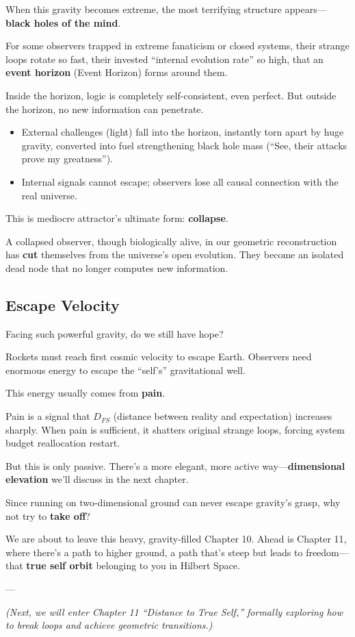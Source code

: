 When this gravity becomes extreme, the most terrifying structure appears---\textbf{black holes of the mind}.

For some observers trapped in extreme fanaticism or closed systems, their strange loops rotate so fast, their invested ``internal evolution rate'' so high, that an \textbf{event horizon} (Event Horizon) forms around them.

Inside the horizon, logic is completely self-consistent, even perfect. But outside the horizon, no new information can penetrate.

\begin{itemize}
\item External challenges (light) fall into the horizon, instantly torn apart by huge gravity, converted into fuel strengthening black hole mass (``See, their attacks prove my greatness'').

\item Internal signals cannot escape; observers lose all causal connection with the real universe.
\end{itemize}

This is mediocre attractor's ultimate form: \textbf{collapse}.

A collapsed observer, though biologically alive, in our geometric reconstruction has \textbf{cut} themselves from the universe's open evolution. They become an isolated dead node that no longer computes new information.

\subsection{Escape Velocity}

Facing such powerful gravity, do we still have hope?

Rockets must reach first cosmic velocity to escape Earth. Observers need enormous energy to escape the ``self's'' gravitational well.

This energy usually comes from \textbf{pain}.

Pain is a signal that $D_{FS}$ (distance between reality and expectation) increases sharply. When pain is sufficient, it shatters original strange loops, forcing system budget reallocation restart.

But this is only passive. There's a more elegant, more active way---\textbf{dimensional elevation} we'll discuss in the next chapter.

Since running on two-dimensional ground can never escape gravity's grasp, why not try to \textbf{take off}?

We are about to leave this heavy, gravity-filled Chapter 10. Ahead is Chapter 11, where there's a path to higher ground, a path that's steep but leads to freedom---that \textbf{true self orbit} belonging to you in Hilbert Space.

---

\textit{(Next, we will enter Chapter 11 ``Distance to True Self,'' formally exploring how to break loops and achieve geometric transitions.)}


